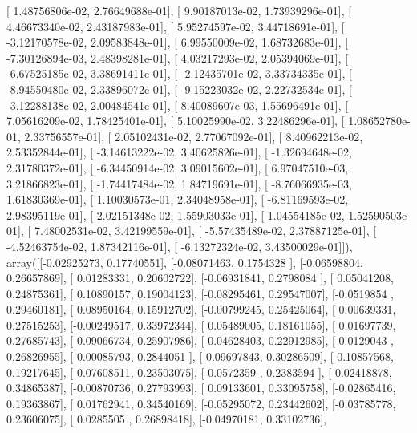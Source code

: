 \documentclass{article}
\begin{document}
       [  1.48756806e-02,   2.76649688e-01],
       [  9.90187013e-02,   1.73939296e-01],
       [  4.46673340e-02,   2.43187983e-01],
       [  5.95274597e-02,   3.44718691e-01],
       [ -3.12170578e-02,   2.09583848e-01],
       [  6.99550009e-02,   1.68732683e-01],
       [ -7.30126894e-03,   2.48398281e-01],
       [  4.03217293e-02,   2.05394069e-01],
       [ -6.67525185e-02,   3.38691411e-01],
       [ -2.12435701e-02,   3.33734335e-01],
       [ -8.94550480e-02,   2.33896072e-01],
       [ -9.15223032e-02,   2.22732534e-01],
       [ -3.12288138e-02,   2.00484541e-01],
       [  8.40089607e-03,   1.55696491e-01],
       [  7.05616209e-02,   1.78425401e-01],
       [  5.10025990e-02,   3.22486296e-01],
       [  1.08652780e-01,   2.33756557e-01],
       [  2.05102431e-02,   2.77067092e-01],
       [  8.40962213e-02,   2.53352844e-01],
       [ -3.14613222e-02,   3.40625826e-01],
       [ -1.32694648e-02,   2.31780372e-01],
       [ -6.34450914e-02,   3.09015602e-01],
       [  6.97047510e-03,   3.21866823e-01],
       [ -1.74417484e-02,   1.84719691e-01],
       [ -8.76066935e-03,   1.61830369e-01],
       [  1.10030573e-01,   2.34048958e-01],
       [ -6.81169593e-02,   2.98395119e-01],
       [  2.02151348e-02,   1.55903033e-01],
       [  1.04554185e-02,   1.52590503e-01],
       [  7.48002531e-02,   3.42199559e-01],
       [ -5.57435489e-02,   2.37887125e-01],
       [ -4.52463754e-02,   1.87342116e-01],
       [ -6.13272324e-02,   3.43500029e-01]]), array([[-0.02925273,  0.17740551],
       [-0.08071463,  0.1754328 ],
       [-0.06598804,  0.26657869],
       [ 0.01283331,  0.20602722],
       [-0.06931841,  0.2798084 ],
       [ 0.05041208,  0.24875361],
       [ 0.10890157,  0.19004123],
       [-0.08295461,  0.29547007],
       [-0.0519854 ,  0.29460181],
       [ 0.08950164,  0.15912702],
       [-0.00799245,  0.25425064],
       [ 0.00639331,  0.27515253],
       [-0.00249517,  0.33972344],
       [ 0.05489005,  0.18161055],
       [ 0.01697739,  0.27685743],
       [ 0.09066734,  0.25907986],
       [ 0.04628403,  0.22912985],
       [-0.0129043 ,  0.26826955],
       [-0.00085793,  0.2844051 ],
       [ 0.09697843,  0.30286509],
       [ 0.10857568,  0.19217645],
       [ 0.07608511,  0.23503075],
       [-0.0572359 ,  0.2383594 ],
       [-0.02418878,  0.34865387],
       [-0.00870736,  0.27793993],
       [ 0.09133601,  0.33095758],
       [-0.02865416,  0.19363867],
       [ 0.01762941,  0.34540169],
       [-0.05295072,  0.23442602],
       [-0.03785778,  0.23606075],
       [ 0.0285505 ,  0.26898418],
       [-0.04970181,  0.33102736],
\end{document}
